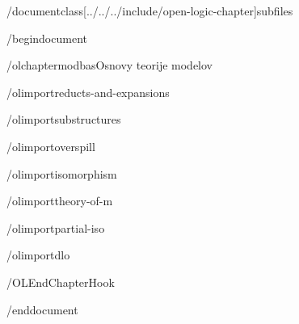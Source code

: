 
/documentclass[../../../include/open-logic-chapter]{subfiles}

/begin{document}

/olchapter{mod}{bas}{Osnovy teorije modelov}

/olimport{reducts-and-expansions}

/olimport{substructures}

/olimport{overspill}

/olimport{isomorphism}

/olimport{theory-of-m}

/olimport{partial-iso}

/olimport{dlo}


/OLEndChapterHook

/end{document}
